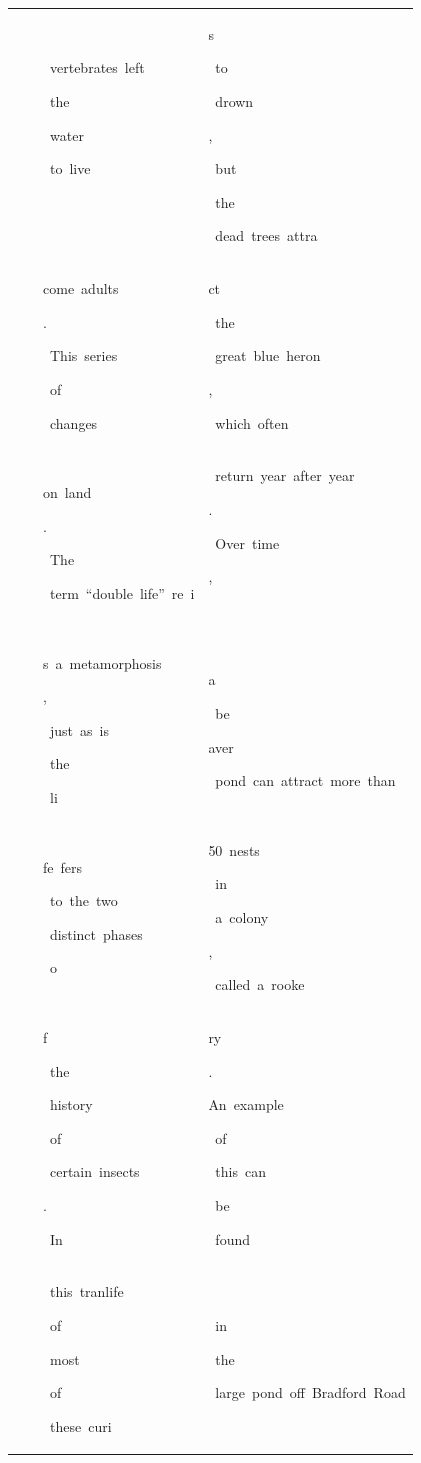 \begin{table}[h]
\begin{tabular}{ l | l | l | l }
  &  & \colorbox{cm_0!40}{\strut \ vertebrates\ left}\colorbox{cm_12!40}{\strut \ the}\colorbox{cm_25!40}{\strut \ water}\colorbox{cm_12!40}{\strut \ to\ live}\colorbox{cm_0!40}{\strut \ } & \colorbox{cm_0!40}{\strut s}\colorbox{cm_12!40}{\strut \ to}\colorbox{cm_0!40}{\strut \ drown}\colorbox{cm_12!40}{\strut ,}\colorbox{cm_0!40}{\strut \ but}\colorbox{cm_12!40}{\strut \ the}\colorbox{cm_0!40}{\strut \ dead\ trees\ attra} \\ 
  &  & \colorbox{cm_0!40}{\strut come\ adults}\colorbox{cm_12!40}{\strut .}\colorbox{cm_0!40}{\strut \ This\ series}\colorbox{cm_12!40}{\strut \ of}\colorbox{cm_0!40}{\strut \ changes\ } & \colorbox{cm_0!40}{\strut ct}\colorbox{cm_12!40}{\strut \ the}\colorbox{cm_0!40}{\strut \ great\ blue\ heron}\colorbox{cm_12!40}{\strut ,}\colorbox{cm_0!40}{\strut \ which\ often} \\ 
  &  & \colorbox{cm_0!40}{\strut on\ land}\colorbox{cm_12!40}{\strut .}\colorbox{cm_25!40}{\strut \ The}\colorbox{cm_0!40}{\strut \ term\ “double\ life”\ re\ i} & \colorbox{cm_0!40}{\strut \ return\ year\ after\ year}\colorbox{cm_12!40}{\strut .}\colorbox{cm_0!40}{\strut \ Over\ time}\colorbox{cm_12!40}{\strut ,}\colorbox{cm_0!40}{\strut \ } \\ 
  &  & \colorbox{cm_0!40}{\strut s\ a\ metamorphosis}\colorbox{cm_12!40}{\strut ,}\colorbox{cm_0!40}{\strut \ just\ as\ is}\colorbox{cm_12!40}{\strut \ the}\colorbox{cm_0!40}{\strut \ li} & \colorbox{cm_0!40}{\strut a}\colorbox{cm_12!40}{\strut \ be}\colorbox{cm_25!40}{\strut aver}\colorbox{cm_0!40}{\strut \ pond\ can\ attract\ more\ than\ } \\ 
  &  & \colorbox{cm_0!40}{\strut fe\ fers}\colorbox{cm_12!40}{\strut \ to\ the\ two}\colorbox{cm_0!40}{\strut \ distinct\ phases}\colorbox{cm_12!40}{\strut \ o} & \colorbox{cm_0!40}{\strut 50\ nests}\colorbox{cm_12!40}{\strut \ in}\colorbox{cm_0!40}{\strut \ a\ colony}\colorbox{cm_12!40}{\strut ,}\colorbox{cm_0!40}{\strut \ called\ a\ rooke} \\ 
  &  & \colorbox{cm_12!40}{\strut f}\colorbox{cm_25!40}{\strut \ the}\colorbox{cm_0!40}{\strut \ history}\colorbox{cm_12!40}{\strut \ of}\colorbox{cm_0!40}{\strut \ certain\ insects}\colorbox{cm_12!40}{\strut .}\colorbox{cm_0!40}{\strut \ In} & \colorbox{cm_0!40}{\strut ry}\colorbox{cm_12!40}{\strut .}\colorbox{cm_0!40}{\strut An\ example}\colorbox{cm_12!40}{\strut \ of}\colorbox{cm_0!40}{\strut \ this\ can}\colorbox{cm_12!40}{\strut \ be}\colorbox{cm_0!40}{\strut \ found} \\ 
  &  & \colorbox{cm_0!40}{\strut \ this\ tranlife}\colorbox{cm_12!40}{\strut \ of}\colorbox{cm_0!40}{\strut \ most}\colorbox{cm_12!40}{\strut \ of}\colorbox{cm_0!40}{\strut \ these\ curi} & \colorbox{cm_12!40}{\strut \ in}\colorbox{cm_25!40}{\strut \ the}\colorbox{cm_0!40}{\strut \ large\ pond\ off\ Bradford\ Road} \\ 

\end{tabular}
\end{table}
